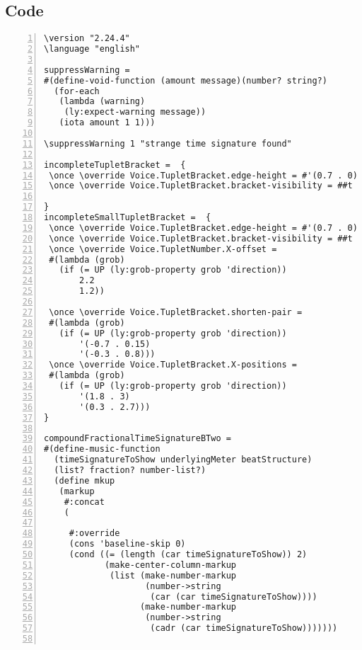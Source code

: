 \subsection{Code}
\begin{Verbatim}[numbers=left,xleftmargin=5mm]
\version "2.24.4"
\language "english"

suppressWarning =
#(define-void-function (amount message)(number? string?)
  (for-each
   (lambda (warning)
    (ly:expect-warning message))
   (iota amount 1 1)))

\suppressWarning 1 "strange time signature found"

incompleteTupletBracket =  {
 \once \override Voice.TupletBracket.edge-height = #'(0.7 . 0)
 \once \override Voice.TupletBracket.bracket-visibility = ##t

}
incompleteSmallTupletBracket =  {
 \once \override Voice.TupletBracket.edge-height = #'(0.7 . 0)
 \once \override Voice.TupletBracket.bracket-visibility = ##t
 \once \override Voice.TupletNumber.X-offset =
 #(lambda (grob)
   (if (= UP (ly:grob-property grob 'direction))
       2.2
       1.2))

 \once \override Voice.TupletBracket.shorten-pair =
 #(lambda (grob)
   (if (= UP (ly:grob-property grob 'direction))
       '(-0.7 . 0.15)
       '(-0.3 . 0.8)))
 \once \override Voice.TupletBracket.X-positions =
 #(lambda (grob)
   (if (= UP (ly:grob-property grob 'direction))
       '(1.8 . 3)
       '(0.3 . 2.7)))
}

compoundFractionalTimeSignatureBTwo =
#(define-music-function
  (timeSignatureToShow underlyingMeter beatStructure)
  (list? fraction? number-list?)
  (define mkup
   (markup
    #:concat
    (

     #:override
     (cons 'baseline-skip 0)
     (cond ((= (length (car timeSignatureToShow)) 2)
            (make-center-column-markup
             (list (make-number-markup
                    (number->string
                     (car (car timeSignatureToShow))))
                   (make-number-markup
                    (number->string
                     (cadr (car timeSignatureToShow)))))))


\end{Verbatim}
